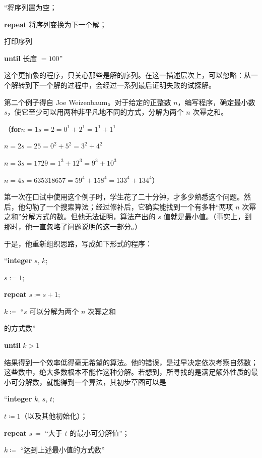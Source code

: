 \documentclass[twoside,11pt,fontset=none]{ctexbook}
\begin{document}
\quad \hspace{-.4em}``将序列置为空；

\quad \textbf{repeat} 将序列变换为下一个解；

\quad \quad 打印序列

\quad \textbf{until} 长度 $= 100$''

这个更抽象的程序，只关心那些是解的序列。在这一描述层次上，可以忽略：从一个解转到下一个解的过程中，会经过一系列最后证明失败的试探解。

第二个例子得自 Joe Weizenbaum。对于给定的正整数 $n$，编写程序，确定最小数 $s$，使它至少可以用两种非平凡地不同的方式，分解为两个 $n$ 次幂之和。

\noindent
（\textbf{for}\tabto{2em}$n = 1$\tabto{6em}$s = 2 = 0^1 + 2^1 = 1^1 + 1^1$

\tabto{2em}$n = 2$\tabto{6em}$s = 25 = 0^2 + 5^2 = 3^2 + 4^2$

\tabto{2em}$n=3$\tabto{6em}$s=1729=1^3 +12^3 =9^3 +10^3$

\tabto{2em}$n = 4$\tabto{6em}$s = 635318657 = 59^4 + 158^4 = 133^4 + 134^4$）

第一次在口试中使用这个例子时，学生花了二十分钟，才多少熟悉这个问题。然后，他勾勒了一个搜索算法；经过修补后，它确实能找到一个有多种“两项 $n$ 次幂之和”分解方式的数。但他无法证明，算法产出的 $s$ 值就是最小值。（事实上，到那时，他一直忽略了问题说明的这一部分。）

于是，他重新组织思路，写成如下形式的程序：

\quad \hspace{-.4em}``\textbf{integer} $s$, $k$;

\quad $s:= 1$;

\quad \textbf{repeat} $s\coloneq s + 1$;

\quad \quad $k\coloneq$ “$s$ 可以分解为两个 $n$ 次幂之和

\quad \quad\quad 的方式数”

\quad \textbf{until} $k > 1$

\noindent
结果得到一个效率低得毫无希望的算法。他的错误，是过早决定依次考察自然数；这些数中，绝大多数根本不能作这种分解。若想到，所寻找的是满足额外性质的最小可分解数，就能得到一个算法，其初步草图可以是

\quad \hspace{-.4em}``\textbf{integer} $k$, $s$, $t$;

\quad $t \coloneq 1$（以及其他初始化）；

\quad \textbf{repeat} $s \coloneq$ “大于 $t$ 的最小可分解值”；

\quad \quad $k \coloneq$ “达到上述最小值的方式数”
\end{document}
